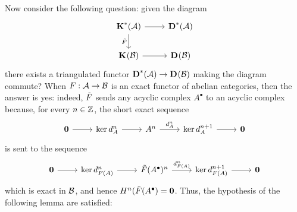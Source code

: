 Now consider the following question:
given the diagram
\begin{equation*}
    \begin{tikzcd}
        \cat{K}^{*}(\Aa) \ar[r] \ar[d, "\Tilde{F}"'] & \cat{D}^{*}(\Aa) \\
        \cat{K}^{}(\Bb) \ar[r] & \cat{D}^{}(\Bb)
    \end{tikzcd}
\end{equation*}
there exists a triangulated functor ${\normalfont\textbf{D}}^{*}(\mathcal{A}) \to {\normalfont\textbf{D}}^{}(\mathcal{B})$
making the diagram commute? When $F:\mathcal{A} \to \mathcal{B}$ is an exact functor
of abelian categories, then the answer is yes: indeed, $\Tilde{F}$
sends any acyclic complex $A^{\bullet}$ to an acyclic complex because,
for every $n \in {\mathbb Z}$, the short exact sequence
\begin{equation*}
    \begin{tikzcd}
        \cat{0} \ar[r]
        & \ker d_{A}^{n} \ar[r]
        & A^{n} \ar[r, "d_{A}^{n}"]
        & \ker d_{A}^{n+1} \ar[r]
        & \cat{0}
    \end{tikzcd}
\end{equation*}
is sent to the sequence
\begin{equation*}
    \begin{tikzcd}
        \cat{0} \ar[r]
        & \ker d_{F(A)}^{n} \ar[r]
        & \Tilde{F}(A^{\bullet})^{n} \ar[r, "d_{F(A)}^{n}"]
        & \ker d_{F(A)}^{n+1} \ar[r]
        & \cat{0}
    \end{tikzcd}
\end{equation*}
which is exact in $\mathcal{B}$, and hence $H^{n}(\Tilde{F}(A^{\bullet}) = {\normalfont\textbf{0}}$.
Thus, the hypothesis of the following lemma are satisfied:

